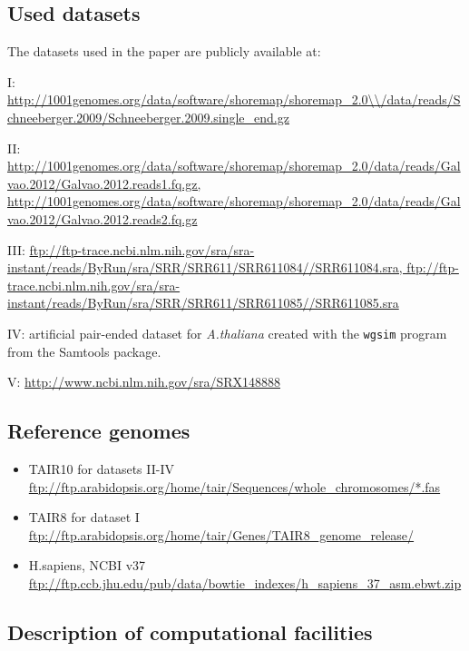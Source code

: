 \documentclass[11pt, oneside]{article}   	%
\begin{document}
\subsection{Used datasets}

The datasets used in the paper are publicly available at:

I: \url{http://1001genomes.org/data/software/shoremap/shoremap\_2.0\\/data/reads/Schneeberger.2009/Schneeberger.2009.single\_end.gz}

II: \url{http://1001genomes.org/data/software/shoremap/shoremap\_2.0/data/reads/Galvao.2012/Galvao.2012.reads1.fq.gz, http://1001genomes.org/data/software/shoremap/shoremap\_2.0/data/reads/Galvao.2012/Galvao.2012.reads2.fq.gz}	

III: \url{ftp://ftp-trace.ncbi.nlm.nih.gov/sra/sra-instant/reads/ByRun/sra/SRR/SRR611/SRR611084//SRR611084.sra, ftp://ftp-trace.ncbi.nlm.nih.gov/sra/sra-instant/reads/ByRun/sra/SRR/SRR611/SRR611085//SRR611085.sra}

IV: artificial pair-ended dataset for {\it A.thaliana} created with the {\tt wgsim} program from the Samtools package.

V: \url{http://www.ncbi.nlm.nih.gov/sra/SRX148888}


\subsection{Reference genomes}
\begin{itemize}
\item TAIR10 for datasets II-IV \url{ftp://ftp.arabidopsis.org/home/tair/Sequences/whole\_chromosomes/*.fas}
\item TAIR8 for dataset I \url{ftp://ftp.arabidopsis.org/home/tair/Genes/TAIR8\_genome\_release/}
\item H.sapiens, NCBI v37 \url{ftp://ftp.ccb.jhu.edu/pub/data/bowtie\_indexes/h\_sapiens\_37\_asm.ebwt.zip}
\end{itemize}

\subsection{Description of computational facilities}
\end{document}
